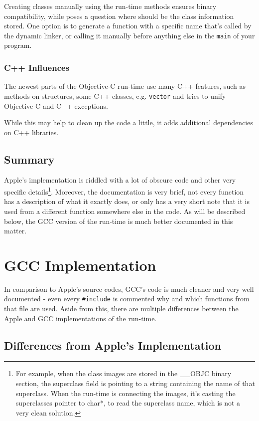 \documentclass[a4paper, 11pt, fleqn]{book}
\begin{document}
Creating classes manually using the run-time methods ensures binary compatibility, while poses a question where should be the class information stored. One option is to generate a function with a specific name that's called by the dynamic linker, or calling it manually before anything else in the \verb=main= of your program.

\subsection{C++ Influences}
The newest parts of the Objective-C run-time use many C++ features, such as methods on structures, some C++ classes, e.g. \verb=vector= and tries to unify Objective-C and C++ exceptions.

While this may help to clean up the code a little, it adds additional dependencies on C++ libraries.


\section{Summary}
Apple's implementation is riddled with a lot of obscure code and other very specific details\footnote{For example, when the class images are stored in the \_\_OBJC binary section, the superclass field is pointing to a string containing the name of that superclass. When the run-time is connecting the images, it's casting the superclasses pointer to char*, to read the superclass name, which is not a very clean solution.}. Moreover, the documentation is very brief, not every function has a description of what it exactly does, or only has a very short note that it is used from a different function somewhere else in the code. As will be described below, the GCC version of the run-time is much better documented in this matter.

\chapter{GCC Implementation}

In comparison to Apple's source codes, GCC's code is much cleaner and very well documented - even every \verb=#include= is commented why and which functions from that file are used. Aside from this, there are multiple differences between the Apple and GCC implementations of the run-time.

\section{Differences from Apple's Implementation}
\end{document}
